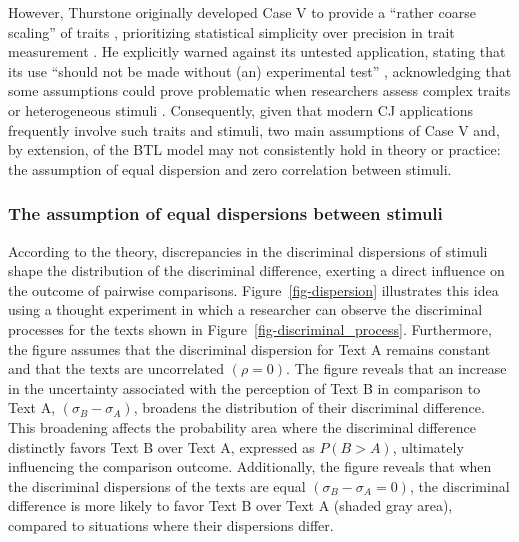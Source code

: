 \documentclass[
  authoryear,
  preprint,
  1p]{elsarticle}
\begin{document}
However, Thurstone originally developed Case V to provide a ``rather
coarse scaling'' of traits \citep[pp.~269]{Thurstone_1927b},
prioritizing statistical simplicity over precision in trait measurement
\citep[pp.~677]{Kelly_et_al_2022}. He explicitly warned against its
untested application, stating that its use ``should not be made without
(an) experimental test'' \citep[pp.~270]{Thurstone_1927b}, acknowledging
that some assumptions could prove problematic when researchers assess
complex traits or heterogeneous stimuli
\citep[pp.~376]{Thurstone_1927a}. Consequently, given that modern CJ
applications frequently involve such traits and stimuli, two main
assumptions of Case V and, by extension, of the BTL model may not
consistently hold in theory or practice: the assumption of equal
dispersion and zero correlation between stimuli.

\subsubsection{The assumption of equal dispersions between
stimuli}\label{sec-theory-issue1a}

According to the theory, discrepancies in the discriminal dispersions of
stimuli shape the distribution of the discriminal difference, exerting a
direct influence on the outcome of pairwise comparisons.
Figure~\ref{fig-dispersion} illustrates this idea using a thought
experiment in which a researcher can observe the discriminal processes
for the texts shown in Figure~\ref{fig-discriminal_process}.
Furthermore, the figure assumes that the discriminal dispersion for Text
A remains constant and that the texts are uncorrelated \((\rho=0)\). The
figure reveals that an increase in the uncertainty associated with the
perception of Text B in comparison to Text A,
\((\sigma_{B}-\sigma_{A})\), broadens the distribution of their
discriminal difference. This broadening affects the probability area
where the discriminal difference distinctly favors Text B over Text A,
expressed as \(P(B > A)\), ultimately influencing the comparison
outcome. Additionally, the figure reveals that when the discriminal
dispersions of the texts are equal \((\sigma_{B}-\sigma_{A}=0)\), the
discriminal difference is more likely to favor Text B over Text A
(shaded gray area), compared to situations where their dispersions
differ.
\end{document}
